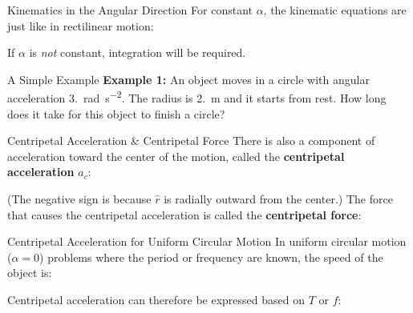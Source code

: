 \documentclass[12pt,compress,aspectratio=169]{beamer}
\begin{document}
\begin{frame}{Kinematics in the Angular Direction}
  For constant $\alpha$, the kinematic equations are just like in rectilinear
  motion:

  
  If $\alpha$ is \emph{not} constant, integration will be required.
\end{frame}



\begin{frame}{A Simple Example}
  \textbf{Example 1:} An object moves in a circle with angular acceleration
  \SI{3.}{\radian\per\second\squared}. The radius is \SI{2.}{\metre} and it
  starts from rest. How long does it take for this object to finish a circle?
\end{frame}



\begin{frame}{Centripetal Acceleration \& Centripetal Force}
  There is also a component of acceleration toward the center of the motion,
  called the \textbf{centripetal acceleration} $a_c$:


  (The negative sign is because $\hat r$ is radially outward from the center.)
  The force that causes the centripetal acceleration is called the
  \textbf{centripetal force}:

\end{frame}



\begin{frame}{Centripetal Acceleration for Uniform Circular Motion}
  In uniform circular motion ($\alpha=0$) problems where the period or
  frequency are known, the speed of the object is:


  Centripetal acceleration can therefore be expressed based on $T$ or $f$:

\end{frame}
\end{document}
